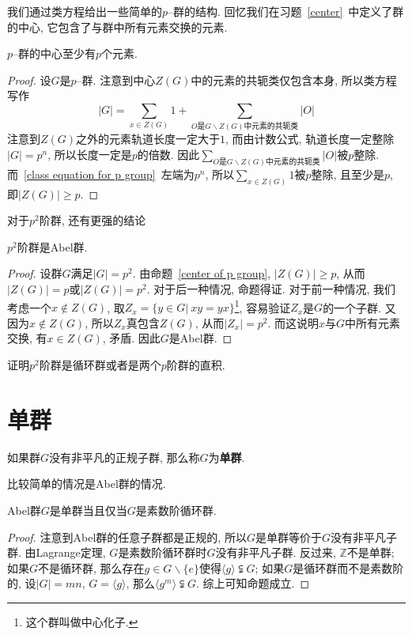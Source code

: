 我们通过类方程给出一些简单的$p$--群的结构.
回忆我们在习题~\ref{center}~中定义了群的中心, 它包含了与群中所有元素交换的元素.
\begin{prop}\label{center of p group}
    $p$--群的中心至少有$p$个元素.
\end{prop}
\begin{proof}
    设$G$是$p$--群.
    注意到中心$Z(G)$中的元素的共轭类仅包含本身, 所以类方程写作
    \begin{equation}
        |G|=\sum_{x\in Z(G)}1+\sum_{O\text{是}G\backslash Z(G)\text{中元素的共轭类}}|O|\label{class equation for p group}
    \end{equation}
    注意到$Z(G)$之外的元素轨道长度一定大于$1$, 而由计数公式, 轨道长度一定整除$|G|=p^n$, 所以长度一定是$p$的倍数.
    因此$\sum_{O\text{是}G\backslash Z(G)\text{中元素的共轭类}}|O|$被$p$整除.
    而~\eqref{class equation for p group}~左端为$p^n$, 所以$\sum_{x\in Z(G)}1$被$p$整除, 且至少是$p$, 即$|Z(G)|\geq p$.
\end{proof}

对于$p^2$阶群, 还有更强的结论
\begin{prop}
    $p^2$阶群是Abel群.
\end{prop}
\begin{proof}
    设群$G$满足$|G|=p^2$.
    由命题~\ref{center of p group}, $|Z(G)|\geq p$, 从而$|Z(G)|=p$或$|Z(G)|=p^2$.
    对于后一种情况, 命题得证.
    对于前一种情况, 我们考虑一个$x\notin Z(G)$, 取$Z_x=\{y\in G|\ xy=yx\}$\footnote{这个群叫做中心化子.}, 容易验证$Z_x$是$G$的一个子群.
    又因为$x\notin Z(G)$, 所以$Z_x$真包含$Z(G)$, 从而$|Z_x|=p^2$.
    而这说明$x$与$G$中所有元素交换, 有$x\in Z(G)$, 矛盾.
    因此$G$是Abel群.
\end{proof}

\begin{ex}
    证明$p^2$阶群是循环群或者是两个$p$阶群的直积.
\end{ex}

\section{单群}

\begin{defn}
    如果群$G$没有非平凡的正规子群, 那么称$G$为\textbf{单群}.
\end{defn}

比较简单的情况是Abel群的情况.
\begin{prop}
    Abel群$G$是单群当且仅当$G$是素数阶循环群.
\end{prop}
\begin{proof}
    注意到Abel群的任意子群都是正规的, 所以$G$是单群等价于$G$没有非平凡子群.
    由Lagrange定理, $G$是素数阶循环群时$G$没有非平凡子群.
    反过来, $\mathbb{Z}$不是单群;
    如果$G$不是循环群, 那么存在$g\in G\backslash\{e\}$使得$\langle g\rangle\subsetneqq G$;
    如果$G$是循环群而不是素数阶的, 设$|G|=mn$, $G=\langle g\rangle$, 那么$\langle g^m\rangle\subsetneqq G$.
    综上可知命题成立.
\end{proof}

